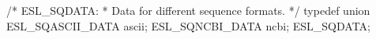 \begin{cchunk}
/* ESL_SQDATA:
 * Data for different sequence formats.
 */
typedef union {
  ESL_SQASCII_DATA ascii;
  ESL_SQNCBI_DATA  ncbi;
} ESL_SQDATA;
\end{cchunk}
